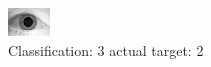 \begin{figure}[h!]
\begin{center}
\includegraphics[width=0.60\columnwidth]{figures/ID1600_class_3_target_2.png}
\end{center}
\caption{ Classification: 3 actual target: 2}
\label{fig:ID1600_class_3_target_2}
\end{figure}
